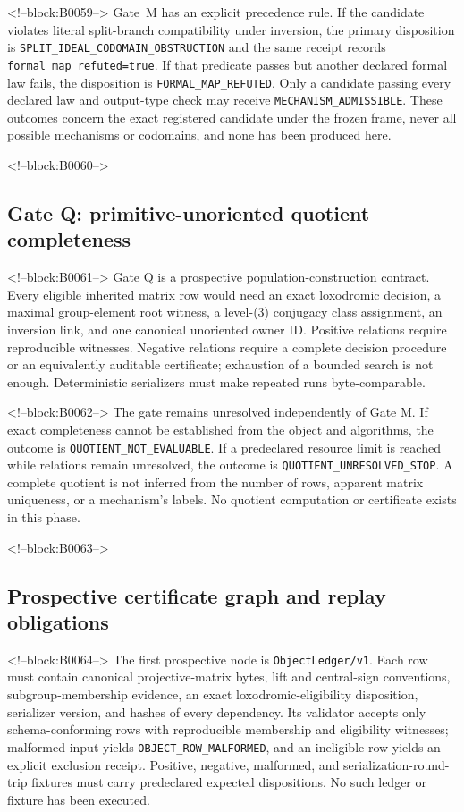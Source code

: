 \documentclass[11pt,a4paper]{article}
\begin{document}
<!--block:B0059-->
Gate~M has an explicit precedence rule. If the candidate violates literal split-branch compatibility under inversion, the primary disposition is \texttt{SPLIT\_IDEAL\_CODOMAIN\_OBSTRUCTION} and the same receipt records \texttt{formal\_map\_refuted=true}. If that predicate passes but another declared formal law fails, the disposition is \texttt{FORMAL\_MAP\_REFUTED}. Only a candidate passing every declared law and output-type check may receive \texttt{MECHANISM\_ADMISSIBLE}. These outcomes concern the exact registered candidate under the frozen frame, never all possible mechanisms or codomains, and none has been produced here.

<!--block:B0060-->
\subsection{Gate Q: primitive-unoriented quotient completeness}

<!--block:B0061-->
Gate Q is a prospective population-construction contract. Every eligible inherited matrix row would need an exact loxodromic decision, a maximal group-element root witness, a level-(3) conjugacy class assignment, an inversion link, and one canonical unoriented owner ID. Positive relations require reproducible witnesses. Negative relations require a complete decision procedure or an equivalently auditable certificate; exhaustion of a bounded search is not enough. Deterministic serializers must make repeated runs byte-comparable.

<!--block:B0062-->
The gate remains unresolved independently of Gate M. If exact completeness cannot be established from the object and algorithms, the outcome is \texttt{QUOTIENT\_NOT\_EVALUABLE}. If a predeclared resource limit is reached while relations remain unresolved, the outcome is \texttt{QUOTIENT\_UNRESOLVED\_STOP}. A complete quotient is not inferred from the number of rows, apparent matrix uniqueness, or a mechanism's labels. No quotient computation or certificate exists in this phase.

<!--block:B0063-->
\subsection{Prospective certificate graph and replay obligations}

<!--block:B0064-->
The first prospective node is \texttt{ObjectLedger/v1}. Each row must contain canonical projective-matrix bytes, lift and central-sign conventions, subgroup-membership evidence, an exact loxodromic-eligibility disposition, serializer version, and hashes of every dependency. Its validator accepts only schema-conforming rows with reproducible membership and eligibility witnesses; malformed input yields \texttt{OBJECT\_ROW\_MALFORMED}, and an ineligible row yields an explicit exclusion receipt. Positive, negative, malformed, and serialization-round-trip fixtures must carry predeclared expected dispositions. No such ledger or fixture has been executed.
\end{document}
